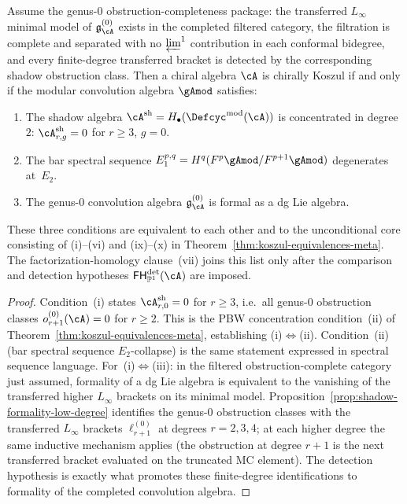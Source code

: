 \begin{proposition}
\label{prop:koszulness-formality-equivalence}

Assume the genus-$0$ obstruction-completeness package: the transferred
$L_\infty$ minimal model of
$\mathfrak{g}^{(0)}_\cA$ exists in the completed filtered category, the
filtration is complete and separated with no $\varprojlim^1$ contribution
in each conformal bidegree, and every finite-degree transferred bracket is
detected by the corresponding shadow obstruction class. Then a chiral
algebra $\cA$ is chirally Koszul if and only if the modular
convolution algebra $\gAmod$ satisfies:
\begin{enumerate}[label=\textup{(\roman*)}]
\item The shadow algebra
 $\cA^{\mathrm{sh}} = H_\bullet(\Defcyc^{\mathrm{mod}}(\cA))$ is
 concentrated in degree~$2$:
 $\cA^{\mathrm{sh}}_{r,g} = 0$ for $r \geq 3$, $g = 0$.
\item The bar spectral sequence
 $E_1^{p,q} = H^q(F^p\gAmod/F^{p+1}\gAmod)$ degenerates
 at~$E_2$.
\item The genus-$0$ convolution algebra
 $\mathfrak{g}^{(0)}_\cA$ is formal as a dg Lie algebra.
\end{enumerate}
These three conditions are equivalent to each other and to the
unconditional core consisting of
\textup{(i)--(vi)} and \textup{(ix)--(x)} in
Theorem~\textup{\ref{thm:koszul-equivalences-meta}}.
The factorization-homology clause~\textup{(vii)} joins this list only
after the comparison and detection hypotheses
$\mathsf{FH}^{\mathrm{det}}_{\mathbb{P}^1}(\cA)$ are imposed.
\end{proposition}

\begin{proof}
Condition~(i) states $\cA^{\mathrm{sh}}_{r,0} = 0$ for $r \geq 3$,
i.e.\ all genus-$0$ obstruction classes
$o_{r+1}^{(0)}(\cA) = 0$ for $r \geq 2$. This is the PBW
concentration condition~(ii) of
Theorem~\ref{thm:koszul-equivalences-meta}, establishing
(i)$\Leftrightarrow$(ii).
Condition~(ii) (bar spectral sequence $E_2$-collapse) is the same
statement expressed in spectral sequence language.
For~(i)$\Leftrightarrow$(iii): in the filtered obstruction-complete
category just assumed, formality of a dg Lie algebra is equivalent to the
vanishing of the transferred higher $L_\infty$ brackets on its minimal
model.
Proposition~\ref{prop:shadow-formality-low-degree} identifies
the genus-$0$ obstruction classes with the transferred $L_\infty$
brackets $\ell_{r+1}^{(0)}$ at degrees $r = 2,3,4$; at each
higher degree the same inductive mechanism applies (the
obstruction at degree $r{+}1$ is the next transferred bracket
evaluated on the truncated MC element). The detection hypothesis is
exactly what promotes these finite-degree identifications to formality of
the completed convolution algebra.
\end{proof}

